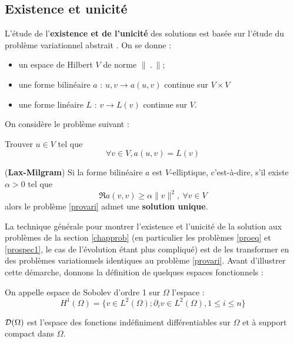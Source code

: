 \documentclass[12pt]{book}
\begin{document}
\subsection{Existence et unicit\'e}\label{secexist}
L'\'etude de l'{\bf existence et de l'unicit\'e} des solutions est bas\'ee
sur l'\'etude du probl\`eme variationnel abstrait
\cite{ma:equad:Dautray4}.
On se donne :
\begin{itemize}
\item un espace de Hilbert $V$ de norme $\|\ .\ \|$;
\item une forme bilin\'eaire $a$ : $u,v\rightarrow a(u,v)$ continue
sur $V\times V$
\item une forme lin\'eaire $L$ : $v\rightarrow L(v)$ continue sur $V$.
\end{itemize}
On consid\`ere le probl\`eme suivant :
\begin{prob}\label{provari} 
Trouver $u\in V$ tel que 
\begin{equation}
\forall v\in V, a(u,v)=L(v)
\end{equation}
\end{prob}
\begin{thm}({\bf Lax-Milgram})
Si la forme bilin\'eaire $a$ est $V$-elliptique, c'est-\`a-dire, s'il
existe $\alpha>0$ tel que
\begin{equation}
\Re a(v,v)\geq \alpha\|v\|^2,\ \forall v\in V
\end{equation}
alors le probl\`eme \ref{provari} admet une {\bf solution unique}.
\end{thm}
La technique g\'en\'erale pour montrer l'existence et l'unicit\'e de la
solution aux probl\`emes de la section \ref{chapprob} (en particulier les
probl\`emes \ref{proeq} et
\ref{prospec1}, le cas de l'\'evolution \'etant plus compliqu\'e) est de les
transformer 
en des probl\`emes variationnels identiques au probl\`eme \ref{provari}.
Avant d'illustrer cette d\'emarche, donnons la d\'efinition de quelques
espaces fonctionnels :
\begin{defn}
On appelle espace de Sobolev d'ordre 1 sur $\Omega$ l'espace :
\begin{equation}
H^1(\Omega)=\{v\in L^2(\Omega); \partial_i v\in L^2(\Omega), 1\leq i
\leq n \}
\end{equation}
\end{defn}
\begin{defn}
${\cal D}(\Omega)$ est l'espace des fonctions ind\'efiniment
diff\'erentiables sur $\Omega$ et \`a support compact dans $\Omega$.
\end{defn}
\end{document}
